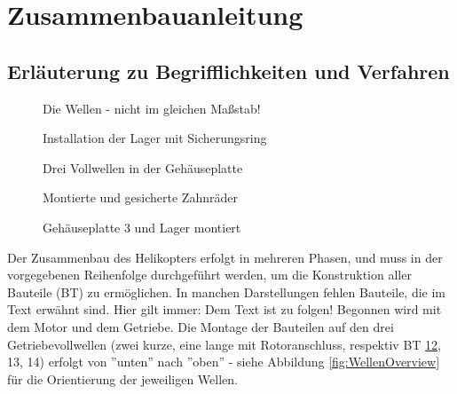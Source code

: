 \documentclass[10pt, a4paper]{article}
\newcommand{\CaptSpac}{-10pt}
\begin{document}
\setlength{\fboxsep}{0pt}%
\setlength{\fboxrule}{1pt}%

\tableofcontents

\newpage

\section{Zusammenbauanleitung\label{AnleitungMain}}
\subsection{Erläuterung zu Begrifflichkeiten und Verfahren}
\begin{wrapfigure}{r}{0.31\textwidth}  
  \vspace{-12pt}
  \vspace{\CaptSpac}
  \caption{\label{fig:WellenOverview}Die Wellen - nicht im gleichen Maßstab!}
  \vspace{\CaptSpac}
  \caption{\label{fig:Bauschritt1}Installation der Lager mit Sicherungsring}
  \vspace{\CaptSpac}
  \caption{\label{fig:Bauschritt2}Drei Vollwellen in der Gehäuseplatte} 
  \vspace{\CaptSpac}
  \caption{\label{fig:Bauschritt3}Montierte und gesicherte Zahnräder}
  \vspace{\CaptSpac}
  \caption{\label{fig:Bauschritt4}Gehäuseplatte 3 und Lager montiert}
  \vspace{-70pt}
\end{wrapfigure}
Der Zusammenbau des Helikopters erfolgt in mehreren Phasen, und muss in der vorgegebenen Reihenfolge durchgeführt werden, um die Konstruktion aller Bauteile (BT) zu ermöglichen. In manchen Darstellungen fehlen Bauteile, die im Text erwähnt sind. Hier gilt immer: Dem Text ist zu folgen! 
Begonnen wird mit dem Motor und dem Getriebe. Die Montage der Bauteilen auf den drei Getriebevollwellen (zwei kurze, eine lange mit Rotoranschluss, respektiv BT \hyperlink{Welle1}{12}, 13, 14) \allowbreak erfolgt von ''unten'' nach ''oben'' - siehe Abbildung \ref{fig:WellenOverview} für die Orientierung der jeweiligen \allowbreak Wellen.
\end{document}
